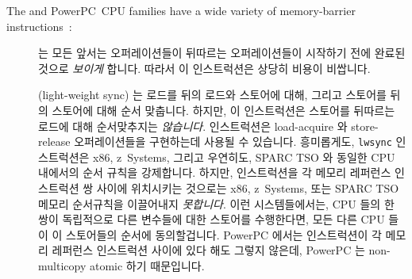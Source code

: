 The \Power{} and PowerPC\mytextregistered\
CPU families have a wide variety of memory-barrier
instructions~\cite{PowerPC94,MichaelLyons05a}:
\fi
\begin{description}
\item	[] 는 모든 앞서는 오퍼레이션들이 뒤따르는 오퍼레이션들이
	시작하기 전에 완료된 것으로 {\em 보이게} 합니다.
	따라서 이 인스트럭션은 상당히 비용이 비쌉니다.
\item	[] (light-weight sync) 는 로드를 뒤의 로드와 스토어에 대해,
	그리고 스토어를 뒤의 스토어에 대해 순서 맞춥니다.
	하지만, 이 인스트럭션은 스토어를 뒤따르는 로드에 대해 순서맞추지는 {\em
	않습니다}.
	 인스트럭션은 load-acquire 와 store-release 오퍼레이션들을
	구현하는데 사용될 수 있습니다.
	흥미롭게도, {\tt lwsync} 인스트럭션은 x86, z~Systems, 그리고 우연히도,
	SPARC TSO 와 동일한 CPU 내에서의 순서 규칙을 강제합니다.
	하지만,  인스트럭션을 각 메모리 레퍼런스 인스트럭션 쌍
	사이에 위치시키는 것으로는 x86, z~Systems, 또는 SPARC TSO 메모리
	순서규칙을 이끌어내지 \emph{못합니다}.
	이런 시스템들에서는, CPU 들의 한 쌍이 독립적으로 다른 변수들에 대한
	스토어를 수행한다면, 모든 다른 CPU 들이 이 스토어들의 순서에
	동의할겁니다.
	PowerPC 에서는  인스트럭션이 각 메모리 레퍼런스 인스트럭션
	사이에 있다 해도 그렇지 않은데, PowerPC 는 non-multicopy atomic 하기
	때문입니다.
\iffalse


\end{description}
